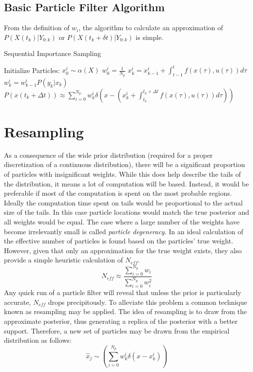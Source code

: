 \subsection{Basic Particle Filter Algorithm}
From the definition of $w_i$, the algorithm to calculate
an approximation of $P(X(t_k) | Y_{0:k})$ or $P(X(t_k + \delta t) | Y_{0:k})$
is simple.

\begin{algorithm}
\caption{Sequential Importance Sampling}
\begin{algorithmic}
\STATE Initialize Particles:
    \STATE $x^i_0  \sim \alpha(X)$
    \STATE $w^i_0 = \frac{1}{N_p}$
\ENDFOR
{}
        \STATE $x^i_k = x^i_{k-1} + \int_{t-1}^t f(x(\tau), u(\tau)) d\tau $
        \STATE $w^i_k = w^i_{k-1}P(y_k | x_k)$
    \ENDFOR
\ENDFOR
\STATE $P(x(t_k+\Delta t)) \approx 
\sum_{i=0}^{N_p} w^i_k \delta\left(x - (x^i_k + \int_{t_k}^{t_k+\Delta t} f(x(\tau), u(\tau)) d\tau) \right)$
\end{algorithmic}
\end{algorithm}

\section{Resampling}
\label{sec:Particle Filter Resampling}
As a consequence 
of the wide prior distribution (required for a proper discretization of a continuous
distribution), there will be a significant proportion of particles with insignificant weights. 
While this does help
describe the tails of the distribution, it means a lot of computation will be based.
Instead, it would be preferable if most of the computation is spent on the most probable regions.
Ideally the computation time spent on tails would be proportional to the actual size of the
tails. In this case particle locations would match the true posterior and all weights would
be equal.  The case where a large number of the weights have become irrelevantly small
is called \emph{particle degeneracy}. In  \cite{Liu1998b}
an ideal calculation of the effective number of particles is found based on the 
particles' true weight. However, given that only an approximation for the true weight 
exists, they also provide a simple heuristic calculation of $N_{eff}$.
\begin{equation}
N_{eff} \approx \frac{\sum_{i=0}^{N_p} w_i}{\sum_{i=0}^{N_p} w_i^2}
\label{eq:neff}
\end{equation}
Any quick run of a particle filter will reveal that unless the prior is particularly accurate,
$N_{eff}$ drops precipitously.  To alleviate this problem
a common technique known as resampling may be applied. The idea of resampling is to 
draw from the approximate posterior, thus generating a replica of the posterior with 
a better support. Therefore, a new set of particles may be drawn from the empirical
distribution as follows:
\begin{equation}
\hat{x}_j \sim \left(\sum_{i=0}^{N_p} w^i_k\delta(x - x^i_k)\right)
\end{equation}

